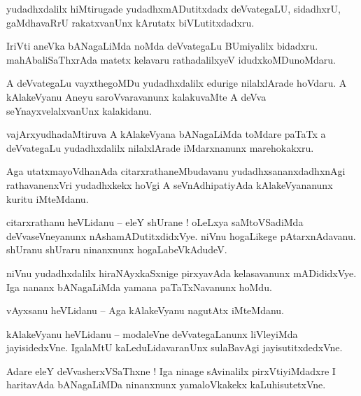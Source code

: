 \documentclass{article}
\begin{document}
\begin{mng}%
yudadhxdalilx hiMtirugade yudadhxmADutitxdadx deVvategaLU, sidadhxrU, gaMdhavaRrU rakatxvanUnx 
kArutatx biVLutitxdadxru.
\end{mng}

\begin{mng}%
IriVti aneVka bANagaLiMda noMda deVvategaLu BUmiyalilx bidadxru. mahAbaliSaThxrAda matetx kelavaru 
rathadalilxyeV idudxkoMDunoMdaru.
\end{mng}

\begin{mng}%
A deVvategaLu vayxthegoMDu yudadhxdalilx edurige nilalxlArade hoVdaru. A kAlakeVyanu Aneyu 
saroVvaravanunx kalakuvaMte A deVva seYnayxvelalxvanUnx kalakidanu.
\end{mng}

\begin{mng}%
vajArxyudhadaMtiruva A kAlakeVyana bANagaLiMda toMdare paTaTx a deVvategaLu yudadhxdalilx 
nilalxlArade iMdarxnanunx marehokakxru.
\end{mng}

\begin{mng}%
Aga utatxmayoVdhanAda citarxrathaneMbudavanu yudadhxsananxdadhxnAgi rathavanenxVri yudadhxkekx 
hoVgi A seVnAdhipatiyAda kAlakeVyananunx kuritu iMteMdanu.
\end{mng}

\begin{mng}%
citarxrathanu heVLidanu -- eleY shUrane ! oLeLxya saMtoVSadiMda deVvaseVneyanunx 
nAshamADutitxdidxVye. niVnu hogaLikege pAtarxnAdavanu. shUranu shUraru ninanxnunx hogaLabeVkAdudeV.
\end{mng}

\begin{mng}%
niVnu yudadhxdalilx hiraNAyxkaSxnige pirxyavAda kelasavanunx mADididxVye. Iga nananx bANagaLiMda 
yamana paTaTxNavanunx hoMdu.
\end{mng}

\begin{mng}%
vAyxsanu heVLidanu -- Aga kAlakeVyanu nagutAtx iMteMdanu. 
\end{mng}

\begin{mng}%
kAlakeVyanu heVLidanu -- modaleVne deVvategaLanunx liVleyiMda jayisidedxVne. IgalaMtU 
kaLeduLidavaranUnx sulaBavAgi jayisutitxdedxVne.
\end{mng}

\begin{mng}%
Adare eleY deVvasherxVSaThxne ! Iga ninage sAvinalilx pirxVtiyiMdadxre I haritavAda bANagaLiMDa 
ninanxnunx yamaloVkakekx kaLuhisutetxVne.
\end{mng}
\end{document}
